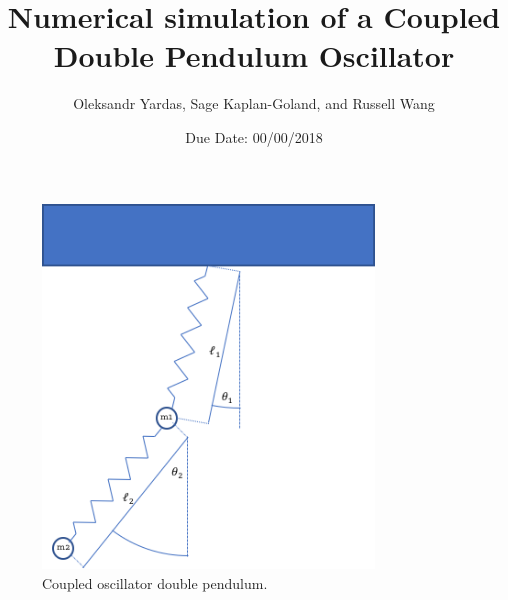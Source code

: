 \documentclass[12pt]{article}
\title{Numerical simulation of a Coupled Double Pendulum Oscillator} %
\author{Oleksandr Yardas, Sage Kaplan-Goland, and Russell Wang} %
\date{Due Date: 00/00/2018 } %
\begin{document}
	\maketitle
	\thispagestyle{empty}
	
	\newpage
	\begin{figure}
	\includegraphics[width=250pt]{figure1.png}
	\caption{Coupled oscillator double pendulum.}
	\label{fig:figure1}
	\end{figure}
\end{document}
